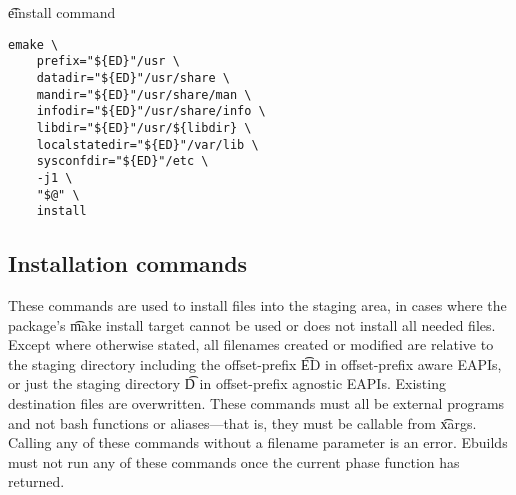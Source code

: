 \begin{description}
\begin{listing}[H]
\caption{\t{einstall} command} \label{lst:einstall}
\begin{verbatim}
emake \
    prefix="${ED}"/usr \
    datadir="${ED}"/usr/share \
    mandir="${ED}"/usr/share/man \
    infodir="${ED}"/usr/share/info \
    libdir="${ED}"/usr/${libdir} \
    localstatedir="${ED}"/var/lib \
    sysconfdir="${ED}"/etc \
    -j1 \
    "$@" \
    install
\end{verbatim}
\end{listing}

\end{description}

\subsection{Installation commands}
These commands are used to install files into the staging area, in cases where the package's \t{make
install} target cannot be used or does not install all needed files. Except where otherwise stated,
all filenames created or modified are relative to the staging directory including the offset-prefix
\t{ED} in offset-prefix aware EAPIs, or just the staging directory \t{D} in offset-prefix agnostic
EAPIs. Existing destination files are overwritten. These commands must all be external programs and
not bash functions or aliases---that is, they must be callable from \t{xargs}. Calling any of these
commands without a filename parameter is an error. Ebuilds must not run any of these commands once
the current phase function has returned.

